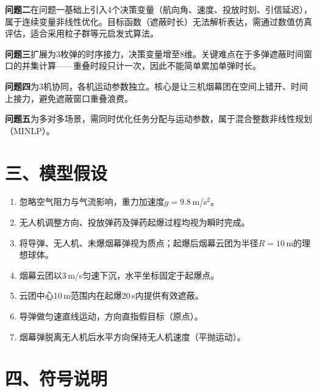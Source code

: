 \documentclass[12pt,a4paper]{article}
\begin{document}
\textbf{问题二}在问题一基础上引入4个决策变量（航向角、速度、投放时刻、引信延迟），属于连续变量非线性优化。目标函数（遮蔽时长）无法解析表达，需通过数值仿真评估，适合采用粒子群等元启发式算法。

\textbf{问题三}扩展为3枚弹的时序接力，决策变量增至8维。关键难点在于多弹遮蔽时间窗口的并集计算——重叠时段只计一次，因此不能简单累加单弹时长。

\textbf{问题四}为3机协同，各机运动参数独立。核心是让三机烟幕团在空间上错开、时间上接力，避免遮蔽窗口重叠浪费。

\textbf{问题五}为多对多场景，需同时优化任务分配与运动参数，属于混合整数非线性规划（MINLP）。

\section{三、模型假设}

\begin{enumerate}[nosep]
  \item 忽略空气阻力与气流影响，重力加速度$g = 9.8$\,m/s$^2$。
  \item 无人机调整方向、投放弹药及弹药起爆过程均视为瞬时完成。
  \item 将导弹、无人机、未爆烟幕弹视为质点；起爆后烟幕云团为半径$R=10$\,m的理想球体。
  \item 烟幕云团以3\,m/s匀速下沉，水平坐标固定于起爆点。
  \item 云团中心10\,m范围内在起爆20\,s内提供有效遮蔽。
  \item 导弹做匀速直线运动，方向直指假目标（原点）。
  \item 烟幕弹脱离无人机后水平方向保持无人机速度（平抛运动）。
\end{enumerate}

\section{四、符号说明}
\end{document}
